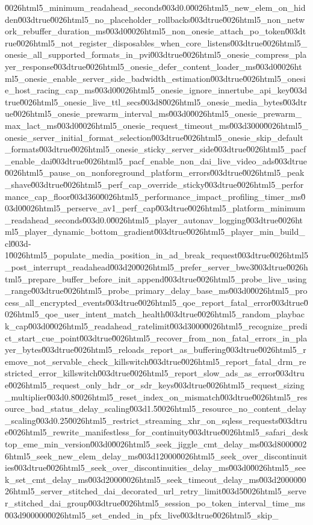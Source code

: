 {\u0026html5_minimum_readahead_seconds\u003d0.0\u0026html5_new_elem_on_hidden\u003dtrue\u0026html5_no_placeholder_rollbacks\u003dtrue\u0026html5_non_network_rebuffer_duration_ms\u003d0\u0026html5_non_onesie_attach_po_token\u003dtrue\u0026html5_not_register_disposables_when_core_listens\u003dtrue\u0026html5_onesie_all_supported_formats_in_pvi\u003dtrue\u0026html5_onesie_compress_player_response\u003dtrue\u0026html5_onesie_defer_content_loader_ms\u003d0\u0026html5_onesie_enable_server_side_badwidth_estimation\u003dtrue\u0026html5_onesie_host_racing_cap_ms\u003d0\u0026html5_onesie_ignore_innertube_api_key\u003dtrue\u0026html5_onesie_live_ttl_secs\u003d8\u0026html5_onesie_media_bytes\u003dtrue\u0026html5_onesie_prewarm_interval_ms\u003d0\u0026html5_onesie_prewarm_max_lact_ms\u003d0\u0026html5_onesie_request_timeout_ms\u003d3000\u0026html5_onesie_server_initial_format_selection\u003dtrue\u0026html5_onesie_skip_default_formats\u003dtrue\u0026html5_onesie_sticky_server_side\u003dtrue\u0026html5_pacf_enable_dai\u003dtrue\u0026html5_pacf_enable_non_dai_live_video_ads\u003dtrue\u0026html5_pause_on_nonforeground_platform_errors\u003dtrue\u0026html5_peak_shave\u003dtrue\u0026html5_perf_cap_override_sticky\u003dtrue\u0026html5_performance_cap_floor\u003d360\u0026html5_performance_impact_profiling_timer_ms\u003d0\u0026html5_perserve_av1_perf_cap\u003dtrue\u0026html5_platform_minimum_readahead_seconds\u003d0.0\u0026html5_player_autonav_logging\u003dtrue\u0026html5_player_dynamic_bottom_gradient\u003dtrue\u0026html5_player_min_build_cl\u003d-1\u0026html5_populate_media_position_in_ad_break_request\u003dtrue\u0026html5_post_interrupt_readahead\u003d20\u0026html5_prefer_server_bwe3\u003dtrue\u0026html5_prepare_buffer_before_init_append\u003dtrue\u0026html5_probe_live_using_range\u003dtrue\u0026html5_probe_primary_delay_base_ms\u003d0\u0026html5_process_all_encrypted_events\u003dtrue\u0026html5_qoe_report_fatal_error\u003dtrue\u0026html5_qoe_user_intent_match_health\u003dtrue\u0026html5_random_playback_cap\u003d0\u0026html5_readahead_ratelimit\u003d3000\u0026html5_recognize_predict_start_cue_point\u003dtrue\u0026html5_recover_from_non_fatal_errors_in_player_bytes\u003dtrue\u0026html5_reloads_report_as_buffering\u003dtrue\u0026html5_remove_not_servable_check_killswitch\u003dtrue\u0026html5_report_fatal_drm_restricted_error_killswitch\u003dtrue\u0026html5_report_slow_ads_as_error\u003dtrue\u0026html5_request_only_hdr_or_sdr_keys\u003dtrue\u0026html5_request_sizing_multiplier\u003d0.8\u0026html5_reset_index_on_mismatch\u003dtrue\u0026html5_resource_bad_status_delay_scaling\u003d1.5\u0026html5_resource_no_content_delay_scaling\u003d0.25\u0026html5_restrict_streaming_xhr_on_sqless_requests\u003dtrue\u0026html5_rewrite_manifestless_for_continuity\u003dtrue\u0026html5_safari_desktop_eme_min_version\u003d0\u0026html5_seek_jiggle_cmt_delay_ms\u003d8000\u0026html5_seek_new_elem_delay_ms\u003d12000\u0026html5_seek_over_discontinuities\u003dtrue\u0026html5_seek_over_discontinuities_delay_ms\u003d0\u0026html5_seek_set_cmt_delay_ms\u003d2000\u0026html5_seek_timeout_delay_ms\u003d20000\u0026html5_server_stitched_dai_decorated_url_retry_limit\u003d5\u0026html5_server_stitched_dai_group\u003dtrue\u0026html5_session_po_token_interval_time_ms\u003d900000\u0026html5_set_ended_in_pfx_live\u003dtrue\u0026html5_skip_}
